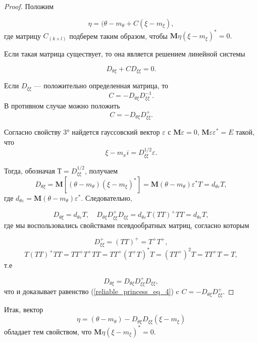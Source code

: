 \begin{proof} Положим

\begin{equation}\label{reliable_princess_eq_3}
\eta = (\theta - m_{\theta} + C(\xi - m_{\xi}),
\end{equation}
где матрицу $C_{(k\times l)}$ подберем таким образом, чтобы $\mathbf{M}\eta(\xi-m_\xi)^* = 0.$


Если такая матрица существует, то она является решением
линейной системы

\begin{equation}\label{reliable_princess_eq_4}
D_{\theta\xi} + CD_{\xi\xi}=0. 
\end{equation}

Если $D_{\xi\xi}$ — положительно определенная матрица, то
\begin{equation}\label{reliable_princess_eq_5}
C = - D_{\theta\xi}D_{\xi\xi}^{-1}. 
\end{equation}
В противном случае можно положить
\begin{equation}\label{reliable_princess_eq_6}
C = - D_{\theta\xi}D_{\xi\xi}^{+}.
\end{equation}

Согласно свойству 3° найдется гауссовский вектор $\varepsilon$ 
с $\mathbf{M}\varepsilon=0$, $\mathbf{M}\varepsilon\varepsilon^*=E$ такой, что
$$\xi-m_xi = D_{\xi\xi}^{1/2}\varepsilon.$$

Тогда, обозначая $Т = D_{\xi\xi}^{1/2}$, получаем
$$D_{\theta\xi} = \mathbf{M}[(\theta-m_\theta)(\xi-m_\xi)^*] = \mathbf{M}(\theta-m_\theta)\varepsilon^*T = d_{\theta\varepsilon}T,$$
где $d_{\theta\varepsilon} = \mathbf{M}(\theta-m_\theta)\varepsilon^*.$ Следовательно,

$$D_{\theta\xi} = d_{\theta\varepsilon}T, \quad 
D_{\theta\xi}D_{\xi\xi}^+D_{\xi\xi} = 
d_{\theta\varepsilon}T(TT)^+TT = d_{\theta\varepsilon}T,$$
где мы воспользовались свойствами псевдообратных
матриц, согласно которым

$$D_{\xi\xi}^+ = (TT)^+ = T^+T^+,$$
$$T(TT)^+TT = TT^+T^+TT = TT^+(T^+T)^*T = (TT^+)^2T = TT^+T = T,$$
т.е

$$D_{\theta\xi} = D_{\theta\xi}D_{\xi\xi}^+D_{\xi\xi},$$
что и доказывает равенство (\ref{reliable_princess_eq_4}) c $C = - D_{\theta\xi}D_{\xi\xi}^{+}.$
\end{proof}


Итак, вектор
\begin{equation}\label{reliable_princess_eq_7}
\eta = (\theta-m_\theta) - D_{\theta\xi}D_{\xi\xi}(\xi - m_\xi) 
\end{equation}
обладает тем свойством, что $\mathbf{M}\eta(\xi-m_\xi)^* = 0.$


